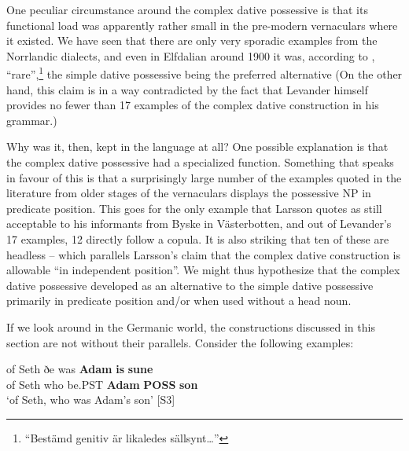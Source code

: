 
One peculiar circumstance around the complex dative possessive is that its functional load was apparently rather small in the pre-modern vernaculars where it existed. We have seen that there are only very sporadic examples from the Norrlandic dialects, and even in Elfdalian around 1900 it was, according to \citet[98-99]{Levander1909}, “rare”,\footnote{ “Bestämd genitiv är likaledes sällsynt…”} the simple dative possessive being the preferred alternative (On the other hand, this claim is in a way contradicted by the fact that Levander himself provides no fewer than 17 examples of the complex dative construction in his grammar.) 


Why was it, then, kept in the language at all? One possible explanation is that the complex dative possessive had a specialized function. Something that speaks in favour of this is that a surprisingly large number of the examples quoted in the literature from older stages of the vernaculars displays the possessive NP in predicate position. This goes for the only example that Larsson quotes as still acceptable to his informants from Byske in Västerbotten, and out of Levander’s 17 examples, 12 directly follow a copula. It is also striking that ten of these are headless – which parallels Larsson’s claim that the complex dative construction is allowable “in independent position”. We might thus hypothesize that the complex dative possessive developed as an alternative to the simple dative possessive primarily in predicate position and/or when used without a head noun. 


If we look around in the Germanic world, the constructions discussed in this section are not without their parallels. Consider the following examples: 


\ea\label{}
\gll of  Seth  ðe  was  \textbf{Adam} \textbf{is} \textbf{sune}\\
of  Seth  who  be.PST  \textbf{Adam} \textbf{POSS} \textbf{son}\\
\glt ‘of Seth, who was Adam’s son’ [S3]
\z

